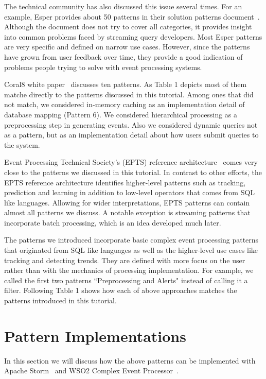 \documentclass{sig-alternate}
\begin{document}
{The technical community has also discussed this issue several times. For an example, Esper provides about 50 patterns in their solution patterns document~\cite{esperPatterns}. Although the document does not try to cover all categories, it provides insight into common problems faced by streaming query developers. Most Esper patterns are very specific and defined on narrow use cases. However, since the patterns have grown from user feedback over time, they provide a good indication of problems people trying to solve with event processing systems. 

Coral8 white paper~\cite{Coral810patterns} discusses ten patterns. As Table 1 depicts most of them matche directly to the patterns discussed in this tutorial. Among ones that did not match, we considered in-memory caching as an implementation detail of database mapping (Pattern 6). We considered hierarchical processing as a preprocessing step in generating events. Also we considered dynamic queries not as a pattern, but as an implementation detail about how users submit queries to the system.

Event Processing Technical Society's (EPTS) reference architecture~\cite{eptsRefArch} comes very close to the patterns we discussed in this tutorial. In contrast to other efforts, the EPTS reference architecture identifies higher-level patterns such as tracking, prediction and learning in addition to low-level operators that comes from SQL like languages. Allowing for wider interpretations, EPTS patterns can contain almost all patterns we discuss. A notable exception is streaming patterns that incorporate batch processing, which is an idea developed much later. 

The patterns we introduced incorporate basic complex event processing patterns that originated from SQL like languages as well as the higher-level use cases like tracking and detecting trends.  They are defined with more focus on the user rather than with the mechanics of processing implementation. For example, we called the first two patterns ``Preprocessing and Alerts" instead of calling it a filter. Following Table 1 shows how each of above approaches matches the patterns introduced in this tutorial. 

\section{Pattern Implementations}  

In this section we will discuss how the above patterns can be implemented with Apache Storm~\cite{storm} and WSO2 Complex Event Processor~\cite{siddhi}. 

}
\end{document}
